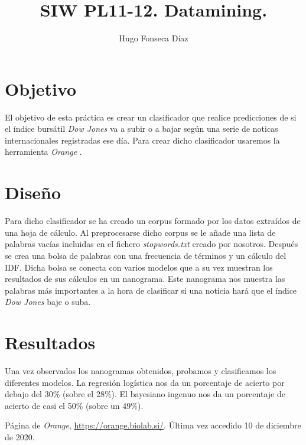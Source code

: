 \documentclass[11pt]{article}
\begin{document}
\title{SIW PL11-12. Datamining.}
\author{Hugo Fonseca Díaz\\ }
\maketitle
\section{Objetivo}
El objetivo de esta práctica es crear un clasificador que realice predicciones de si el índice bursátil \textit{Dow Jones} va a subir o a bajar según una serie de noticas internacionales registradas ese día. Para crear dicho clasificador usaremos la herramienta \textit{Orange} \cite{orange}.
\section{Diseño}
Para dicho clasificador se ha creado un corpus formado por los datos extraídos de una hoja de cálculo. Al preprocesarse dicho corpus se le añade una lista de palabras vacías incluidas en el fichero \textit{stopwords.txt} creado por nosotros. Después se crea una bolsa de palabras con una frecuencia de términos y un cálculo del IDF. Dicha bolsa se conecta con varios modelos que a su vez muestran los resultados de sus cálculos en un nanograma. Este nanograma nos muestra las palabras más importantes a la hora de clasificar si una noticia hará que el índice \textit{Dow Jones} baje o suba.

\section{Resultados}
Una vez observados los nanogramas obtenidos, probamos y clasificamos los diferentes modelos. La regresión logística nos da un porcentaje de acierto por debajo del 30\% (sobre el 28\%). El bayesiano ingenuo nos da un porcentaje de acierto de casi el 50\% (sobre un 49\%). 
\begin{thebibliography}{8}
Página de \textit{Orange}, \url{https://orange.biolab.si/}. Última vez accedido 10 de diciembre de 2020.        
\end{thebibliography}
\end{document}
